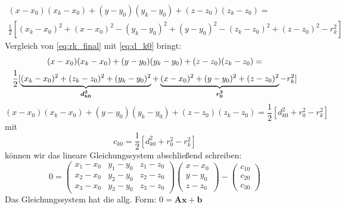 \begin{multline}\label{eq:rk_final}
(x-x_0)(x_k-x_0)+(y-y_0)(y_k-y_0)+(z-z_0)(z_k-z_0)= \\\frac{1}{2}[(x_k-x_0)^2+(x-x_0)^2-(y_k-y_0)^2 +(y-y_0)^2-(z_k-z_0)^2 +(z-z_0)^2-r_k^2]
\end{multline}
%
Vergleich von \eqref{eq:rk_final} mit \eqref{eq:d_k0} bringt: 
%
\begin{multline}
(x-x_0)(x_k-x_0)+(y-y_0)(y_k-y_0)+(z-z_0)(z_k-z_0)= \\\frac{1}{2}[\underbrace{(x_k-x_0)^2+(z_k-z_0)^2+(y_k-y_0)^2}_\text{\boldmath{$d_{k0}^2$}}+\underbrace{(x-x_0)^2+(y-y_0)^2 +(z-z_0)^2}_\text{\boldmath{$r_0^2$}}-r_k^2]
\end{multline}
\begin{equation}
(x-x_0)(x_k-x_0)+(y-y_0)(y_k-y_0)+(z-z_0)(z_k-z_0)=\frac{1}{2}[d_{k0}^2+r_{0}^2-r_k^2]\label{eq:rk_final_simplyfied}
\end{equation}
mit 
\begin{equation}
c_{k0}=\frac{1}{2}[d_{k0}^2+r_{0}^2-r_k^2]\label{eq:c_k0}
\end{equation}
können wir das lineare Gleichungssystem abschließend schreiben:
%
\begin{equation}
0=
\left(
	\begin{array}{ccc}
		x_1-x_0 & y_1-y_0 & z_1-z_0 \\
		x_2-x_0 & y_2-y_0 & z_2-z_0 \\
		x_3-x_0 & y_3-y_0 & z_3-z_0
	\end{array}
\right)
\left(
   \begin{array}{c}
	   x-x_0\\
	   y-y_0\\
	   z-z_0
   \end{array}
\right)
-
\left(
	\begin{array}{c}
		c_{10}\\
		c_{20}\\
		c_{30}
	\end{array}
\right)
\end{equation}
%
Das Gleichungssystem hat die allg. Form: $0 = \mathbf{Ax}+\mathbf{b}$

